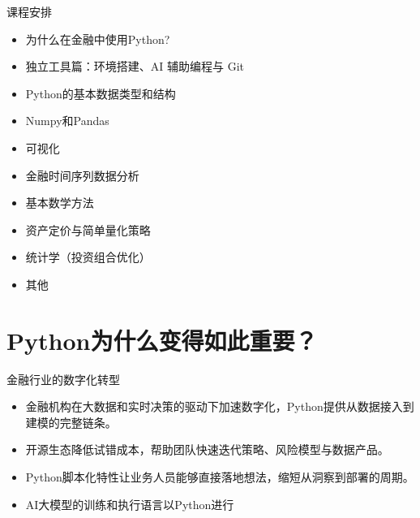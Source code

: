\documentclass[9pt]{ctexbeamer}
\begin{document}
\begin{frame}{课程安排}

	\begin{itemize}
		\item 为什么在金融中使用Python?
		\item 独立工具篇：环境搭建、AI 辅助编程与 Git
		\item Python的基本数据类型和结构
		\item Numpy和Pandas
		\item 可视化
		\item 金融时间序列数据分析
		\item 基本数学方法
		\item 资产定价与简单量化策略
		\item 统计学（投资组合优化）
		\item 其他
	\end{itemize}
\end{frame}


\section{Python为什么变得如此重要？}

\begin{frame}{金融行业的数字化转型}
    \begin{itemize}
        \item 金融机构在大数据和实时决策的驱动下加速数字化，Python提供从数据接入到建模的完整链条。
        \item 开源生态降低试错成本，帮助团队快速迭代策略、风险模型与数据产品。
        \item Python脚本化特性让业务人员能够直接落地想法，缩短从洞察到部署的周期。
        \item AI大模型的训练和执行语言以Python进行
    \end{itemize}
\end{frame}

\end{document}
